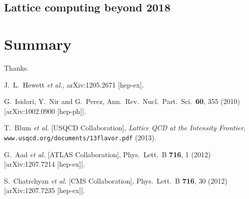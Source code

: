 \subsection{Lattice computing beyond 2018}
\label{subsec:lqcd:future}



\section{Summary}
\label{sec:lqcd:summ}




\Acknowledgements
Thanks.




\begin{thebibliography}{99}



  J.~L.~Hewett {\it et al.},
  arXiv:1205.2671 [hep-ex].
  
  G.~Isidori, Y.~Nir and G.~Perez,
  Ann.\ Rev.\ Nucl.\ Part.\ Sci.\  {\bf 60}, 355 (2010)
  [arXiv:1002.0900 [hep-ph]].
  
T.~Blum {\em et al.} [USQCD Collaboration],
{\em Lattice QCD at the Intensity Frontier},
{\tt www.usqcd.org/documents/13flavor.pdf} (2013).
  
  G.~Aad {\it et al.}  [ATLAS Collaboration],
  Phys.\ Lett.\ B {\bf 716}, 1 (2012)
  [arXiv:1207.7214 [hep-ex]].
  
  S.~Chatrchyan {\it et al.}  [CMS Collaboration],
  Phys.\ Lett.\ B {\bf 716}, 30 (2012)
  [arXiv:1207.7235 [hep-ex]].
  

\end{thebibliography}
